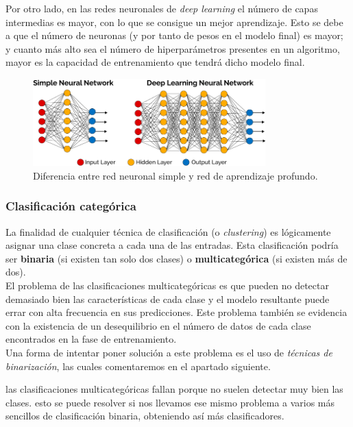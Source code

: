 \documentclass[]{scrartcl}
\begin{document}
		Por otro lado, en las redes neuronales de \textit{deep learning} el número de capas intermedias es mayor, con lo que se consigue un mejor aprendizaje. Esto se debe a que el número de neuronas (y por tanto de pesos en el modelo final) es mayor; y cuanto más alto sea el número de hiperparámetros presentes en un algoritmo, mayor es la capacidad de entrenamiento que tendrá dicho modelo final.\\
		
		\begin{figure}[h]
			\centering
			\includegraphics[width=0.8\textwidth]{./img/neural-network-differences}
			\caption{Diferencia entre red neuronal simple y red de aprendizaje profundo.}
			\label{nn-differences}
		\end{figure}
	
		\subsubsection*{Clasificación categórica}
		
			La finalidad de cualquier técnica de clasificación (o \textit{clustering}) es lógicamente asignar una clase concreta a cada una de las entradas. Esta clasificación podría ser \textbf{binaria} (si existen tan solo dos clases) o \textbf{multicategórica} (si existen más de dos).\\
			
			El problema de las clasificaciones multicategóricas es que pueden no detectar demasiado bien las características de cada clase y el modelo resultante puede errar con alta frecuencia en sus predicciones. Este problema también se evidencia con la existencia de un desequilibrio en el número de datos de cada clase encontrados en la fase de entrenamiento.\\
			
			Una forma de intentar poner solución a este problema es el uso de \textit{técnicas de binarización}, las cuales comentaremos en el apartado siguiente.
	
		las clasificaciones multicategóricas fallan porque no suelen detectar muy bien las clases. esto se puede resolver si nos llevamos ese mismo problema a varios más sencillos de clasificación binaria, obteniendo así más clasificadores.
	
\end{document}
